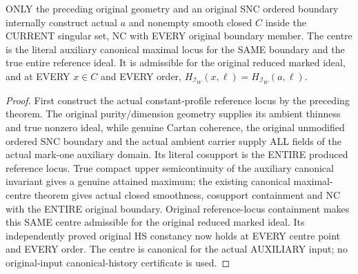 \begin{theorem}
\label{hir:actual-original-hs-constant-singular-auxiliary-canonical-centre}
\leanok
ONLY the preceding original geometry and an original SNC ordered boundary
internally construct actual $a$ and nonempty smooth closed $C$ inside the
CURRENT singular set, NC with EVERY original boundary member. The centre
is the literal auxiliary canonical maximal locus for the SAME boundary
and the true entire reference ideal. It is admissible for the original
reduced marked ideal, and at EVERY $x\in C$ and EVERY order,
$H_{\mathcal I_W}(x,\ell)=H_{\mathcal I_W}(a,\ell)$.
\end{theorem}
\begin{proof}
First construct the actual constant-profile reference locus by the
preceding theorem. The original purity/dimension geometry supplies its
ambient thinness and true nonzero ideal, while genuine Cartan coherence,
the original unmodified ordered SNC boundary and the actual ambient
carrier supply ALL fields of the actual mark-one auxiliary domain.
Its literal cosupport is the ENTIRE produced reference locus. True
compact upper semicontinuity of the auxiliary canonical invariant gives
a genuine attained maximum; the existing canonical maximal-centre theorem
gives actual closed smoothness, cosupport containment and NC with the
ENTIRE original boundary. Original reference-locus containment makes
this SAME centre admissible for the original reduced marked ideal.
Its independently proved original HS constancy now holds at EVERY
centre point and EVERY order. The centre is canonical for the actual
AUXILIARY input; no original-input canonical-history certificate is used.
\end{proof}

